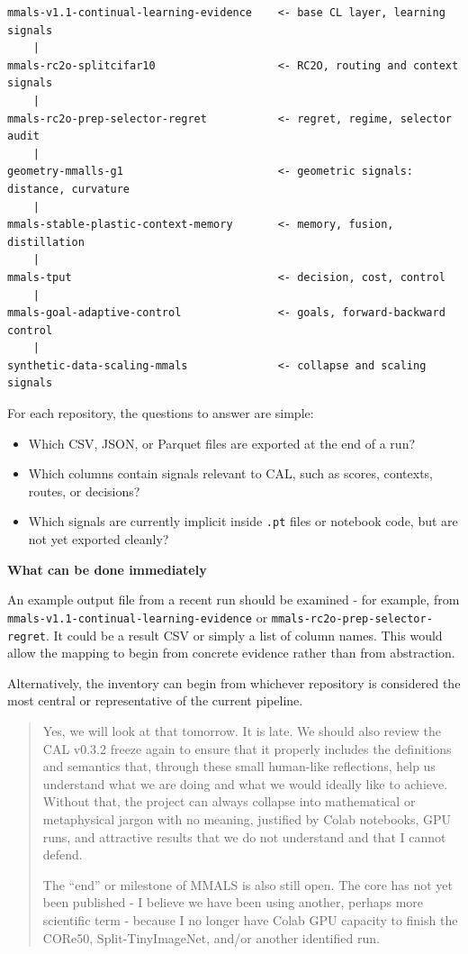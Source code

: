 \begin{lstlisting}
mmals-v1.1-continual-learning-evidence    <- base CL layer, learning signals
    |
mmals-rc2o-splitcifar10                   <- RC2O, routing and context signals
    |
mmals-rc2o-prep-selector-regret           <- regret, regime, selector audit
    |
geometry-mmalls-g1                        <- geometric signals: distance, curvature
    |
mmals-stable-plastic-context-memory       <- memory, fusion, distillation
    |
mmals-tput                                <- decision, cost, control
    |
mmals-goal-adaptive-control               <- goals, forward-backward control
    |
synthetic-data-scaling-mmals              <- collapse and scaling signals
\end{lstlisting}

For each repository, the questions to answer are simple:

\begin{itemize}
\tightlist
\item
  Which CSV, JSON, or Parquet files are exported at the end of a run?
\item
  Which columns contain signals relevant to CAL, such as scores, contexts, routes, or decisions?
\item
  Which signals are currently implicit inside \passthrough{\lstinline!.pt!} files or notebook code, but are not yet exported cleanly?
\end{itemize}

\textbf{What can be done immediately}

An example output file from a recent run should be examined - for example, from \passthrough{\lstinline!mmals-v1.1-continual-learning-evidence!} or \passthrough{\lstinline!mmals-rc2o-prep-selector-regret!}. It could be a result CSV or simply a list of column names. This would allow the mapping to begin from concrete evidence rather than from abstraction.

Alternatively, the inventory can begin from whichever repository is considered the most central or representative of the current pipeline.

\begin{quote}
Yes, we will look at that tomorrow. It is late. We should also review the CAL v0.3.2 freeze again to ensure that it properly includes the definitions and semantics that, through these small human-like reflections, help us understand what we are doing and what we would ideally like to achieve. Without that, the project can always collapse into mathematical or metaphysical jargon with no meaning, justified by Colab notebooks, GPU runs, and attractive results that we do not understand and that I cannot defend.

The ``end'' or milestone of MMALS is also still open. The core has not yet been published - I believe we have been using another, perhaps more scientific term - because I no longer have Colab GPU capacity to finish the CORe50, Split-TinyImageNet, and/or another identified run.
\end{quote}

